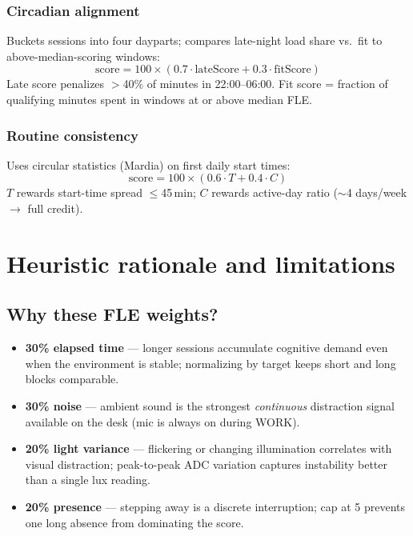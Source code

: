 \documentclass[11pt,a4paper]{report}
\begin{document}
\subsection{Circadian alignment}

Buckets sessions into four dayparts; compares late-night load share vs.\ fit to
above-median-scoring windows:
\[
  \mathrm{score} = 100 \times (0.7 \cdot \mathrm{lateScore} + 0.3 \cdot \mathrm{fitScore})
\]
Late score penalizes $>$40\% of minutes in 22:00--06:00. Fit score = fraction of
qualifying minutes spent in windows at or above median FLE.

\subsection{Routine consistency}

Uses circular statistics (Mardia) on first daily start times:
\[
  \mathrm{score} = 100 \times (0.6 \cdot T + 0.4 \cdot C)
\]
$T$ rewards start-time spread $\leq$45\,min; $C$ rewards active-day ratio
($\sim$4 days/week $\rightarrow$ full credit).

\chapter{Heuristic rationale and limitations}
\label{ch:rationale}

\section{Why these FLE weights?}

\begin{itemize}[leftmargin=*]
  \item \textbf{30\% elapsed time} --- longer sessions accumulate cognitive demand even
        when the environment is stable; normalizing by target keeps short and long blocks comparable.
  \item \textbf{30\% noise} --- ambient sound is the strongest \emph{continuous} distraction
        signal available on the desk (mic is always on during WORK).
  \item \textbf{20\% light variance} --- flickering or changing illumination correlates with
        visual distraction; peak-to-peak ADC variation captures instability better than a single lux reading.
  \item \textbf{20\% presence} --- stepping away is a discrete interruption; cap at 5 prevents
        one long absence from dominating the score.
\end{itemize}
\end{document}

